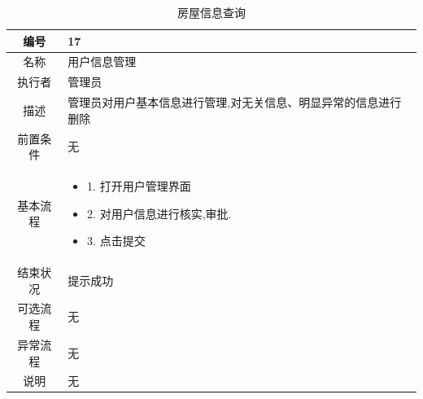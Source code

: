 \begin{table}[htbp]
	\centering
	\begin{tabular}{|c|p{11cm}|}
        \hline
        编号 & 17 \\
        \hline
        名称 & 用户信息管理 \\ 
        \hline
        执行者 &管理员 \\
        \hline
        描述 & 管理员对用户基本信息进行管理,对无关信息、明显异常的信息进行删除 \\
        \hline
        前置条件 & 无 \\
        \hline
        基本流程 & \begin{itemize}
            \item 1. 打开用户管理界面

            \item 2. 对用户信息进行核实,审批.
            
            \item 3. 点击提交
        \end{itemize} \\
        \hline
        结束状况 & 提示成功 \\
        \hline
        可选流程 & 无 \\
        \hline
        异常流程 & 无 \\
        \hline
        说明 & 无 \\
        \hline
    \end{tabular}
    \caption{房屋信息查询}
\end{table}

